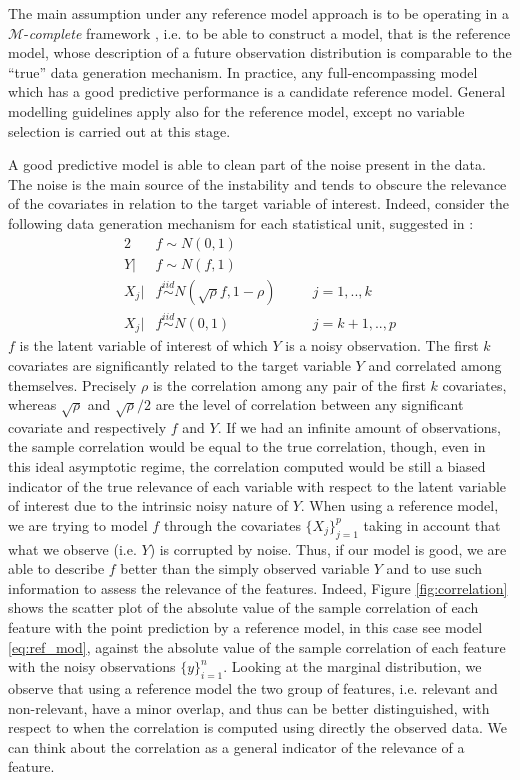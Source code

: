 \documentclass[american,]{article}
\theoremstyle{definition}
\begin{document}
The main assumption under any reference model approach is to be operating in a $\mathcal{M}$-\textit{complete} framework \citep{book:bernardo_smith,paper:vehtari_ojanen}, i.e. to be able to construct a model, that is the reference model, whose description of a future observation distribution is comparable to the ``true'' data generation mechanism. In practice, any full-encompassing model which has a good predictive performance is a candidate reference model. General modelling guidelines apply also for the reference model, except no variable selection is carried out at this stage.
 
A good predictive model is able to clean part of the noise present in the data. The noise is the main source of the instability and tends to obscure the relevance of the covariates in relation to the target variable of interest. Indeed, consider the following data generation mechanism for each statistical unit, suggested in \cite{paper:projpred}:
\
\begin{alignat}{2} \label{eq:simulated_data}
     &f\sim N(0,1) && \nonumber \\ 
     Y|&f\sim N(f,1) && \\
     X_{j}|&f \overset{iid}{\sim} N(\sqrt{\rho}f,1-\rho) \quad &&j=1,..,k \nonumber \\
     X_{j}|&f \overset{iid}{\sim} N(0,1) &&j=k+1,..,p \nonumber
\end{alignat}
$f$ is the latent variable of interest of which $Y$ is a noisy observation. The first $k$ covariates are significantly related to the target variable $Y$ and correlated among themselves. Precisely $\rho$ is the correlation among any pair of the first $k$ covariates, whereas $\sqrt{\rho}$ and $\sqrt{\rho}/2$ are the level of correlation between any significant covariate and respectively $f$ and $Y$. If we had an infinite amount of observations, the sample correlation would be equal to the true correlation, though, even in this ideal asymptotic regime, the correlation computed would be still a biased indicator of the true relevance of each variable with respect to the latent variable of interest due to the intrinsic noisy nature of $Y$. When using a reference model, we are trying to model $f$ through the covariates $\{X_{j}\}_{j=1}^{p}$ taking in account that what we observe (i.e. $Y$) is corrupted by noise. Thus, if our model is good, we are able to describe $f$ better than the simply observed variable $Y$ and to use such information to assess the relevance of the features. Indeed, Figure \ref{fig:correlation} shows the scatter plot of the absolute value of the sample correlation of each feature with the point prediction by a reference model, in this case see model \eqref{eq:ref_mod}, against the absolute value of the sample correlation of each feature with the noisy observations $\{y\}_{i=1}^{n}$. Looking at the marginal distribution, we observe that using a reference model the two group of features, i.e. relevant and non-relevant, have a minor overlap, and thus can be better distinguished, with respect to when the correlation is computed using directly the observed data. We can think about the correlation as a general indicator of the relevance of a feature.  
\end{document}

